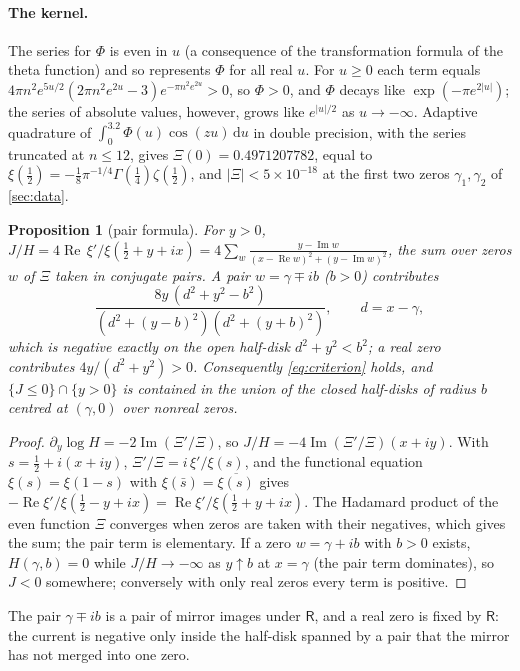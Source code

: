 \documentclass[11pt]{article}
\newtheorem{proposition}[theorem]{Proposition}
\theoremstyle{definition}\newtheorem{definition}[theorem]{Definition}
\theoremstyle{remark}\newtheorem{remark}[theorem]{Remark}
\newcommand{\dd}{\,\mathrm d}\newcommand{\e}{\mathrm e}
\renewcommand{\Re}{\operatorname{Re}}\renewcommand{\Im}{\operatorname{Im}}
\begin{document}
\paragraph{The kernel.} The series for $\Phi$ is even in $u$ (a consequence of the transformation formula of the theta function) and so represents $\Phi$ for all real $u$. For $u\ge0$ each term equals $4\pi n^2e^{5u/2}(2\pi n^2e^{2u}-3)e^{-\pi n^2e^{2u}}>0$, so $\Phi>0$, and $\Phi$ decays like $\exp(-\pi e^{2|u|})$; the series of absolute values, however, grows like $e^{|u|/2}$ as $u\to-\infty$. Adaptive quadrature of $\int_0^{3.2}\Phi(u)\cos(zu)\dd u$ in double precision, with the series truncated at $n\le12$, gives $\Xi(0)=0.4971207782$, equal to $\xi(\frac12)=-\frac18\pi^{-1/4}\Gamma(\frac14)\zeta(\frac12)$, and $|\Xi|<5\times10^{-18}$ at the first two zeros $\gamma_1,\gamma_2$ of \cref{sec:data}.

\begin{proposition}[pair formula]\label{prop:pairformula}
For $y>0$, $J/H=4\Re\,\xi'/\xi(\frac12+y+ix)=4\sum_w\frac{y-\Im w}{(x-\Re w)^2+(y-\Im w)^2}$, the sum over zeros $w$ of $\Xi$ taken in conjugate pairs. A pair $w=\gamma\mp ib$ ($b>0$) contributes
\[
\frac{8y\,(d^2+y^2-b^2)}{(d^2+(y-b)^2)(d^2+(y+b)^2)},\qquad d=x-\gamma,
\]
which is negative exactly on the open half-disk $d^2+y^2<b^2$; a real zero contributes $4y/(d^2+y^2)>0$. Consequently \eqref{eq:criterion} holds, and $\{J\le0\}\cap\{y>0\}$ is contained in the union of the closed half-disks of radius $b$ centred at $(\gamma,0)$ over nonreal zeros.
\end{proposition}
\begin{proof}
$\partial_y\log H=-2\Im(\Xi'/\Xi)$, so $J/H=-4\Im(\Xi'/\Xi)(x+iy)$. With $s=\frac12+i(x+iy)$, $\Xi'/\Xi=i\,\xi'/\xi(s)$, and the functional equation $\xi(s)=\xi(1-s)$ with $\xi(\bar s)=\overline{\xi(s)}$ gives $-\Re\xi'/\xi(\frac12-y+ix)=\Re\xi'/\xi(\frac12+y+ix)$. The Hadamard product of the even function $\Xi$ converges when zeros are taken with their negatives, which gives the sum; the pair term is elementary. If a zero $w=\gamma+ib$ with $b>0$ exists, $H(\gamma,b)=0$ while $J/H\to-\infty$ as $y\uparrow b$ at $x=\gamma$ (the pair term dominates), so $J<0$ somewhere; conversely with only real zeros every term is positive.
\end{proof}
The pair $\gamma\mp ib$ is a pair of mirror images under $\mathsf R$, and a real zero is fixed by $\mathsf R$: the current is negative only inside the half-disk spanned by a pair that the mirror has not merged into one zero.
\end{document}
